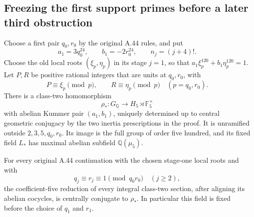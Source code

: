 \subsection{Freezing the first support primes before a later third obstruction}
\label{sec:ghost-prefix-class3}

\begin{lemma}
\label{lem:ghost-prefix-five}
Choose a first pair \(q_0,r_0\) by the original A.44
rules, and put
\[
 a_1=3q_0^{24},\qquad b_1=-2r_0^{24},\qquad
 n_j=(j+4)!.
                                                        \tag{45}
\]
Choose the old local roots \((\xi_p,\eta_p)\) in its
stage \(j=1\), so that
\(a_1\xi_p^{120}+b_1\eta_p^{120}=1\).
Let \(P,R\) be positive rational integers that are
units at \(q_0,r_0\), with
\[
 P\equiv\xi_p\pmod p,\qquad
 R\equiv\eta_p\pmod p
                \quad(p=q_0,r_0).                    \tag{46}
\]
There is a class-two homomorphism
\[
 \rho_*:G_{\mathbb Q}\longrightarrow
     H_5\rtimes\mathbb F_5^\times
                                                        \tag{47}
\]
with abelian Kummer pair \((a_1,b_1)\), uniquely
determined up to central geometric conjugacy by the
two inertia prescriptions in the proof. It is
unramified outside \(2,3,5,q_0,r_0\). Its image is
the full group of order five hundred, and its fixed
field \(L_*\) has maximal abelian subfield
\(\mathbb Q(\mu_5)\).

For every original A.44 continuation with the chosen
stage-one local roots and with
\[
 q_j\equiv r_j\equiv1\pmod{q_0r_0}
                       \quad(j\ge2),                 \tag{48}
\]
the coefficient-five reduction of every integral
class-two section, after aligning its abelian
cocycles, is centrally conjugate to \(\rho_*\).
In particular this field is fixed before the choice
of \(q_1\) and \(r_1\).
\end{lemma}
